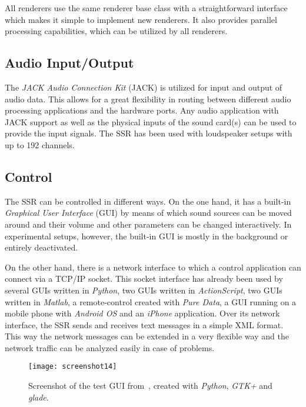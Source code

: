 \documentclass[a4paper]{article}
\begin{document}
All renderers use the same renderer base class with a straightforward interface
which makes it simple to implement new renderers.
It also provides parallel processing capabilities, which can be utilized by all
renderers.

\subsection{Audio Input/Output}

The \emph{JACK Audio Connection Kit} (JACK) is utilized for input and output of
audio data.
This allows for a great flexibility in routing between different audio
processing applications and the hardware ports.
Any audio application with JACK support as well as the physical inputs
of the sound card(s) can be used to provide the input
signals.
The SSR has been used with loudspeaker setups with up to 192 channels.

\subsection{Control}

The SSR can be controlled in different ways. On the one hand, it has a
built-in \emph{Graphical User Interface} (GUI) by means of which sound sources
can be moved around and their volume and other parameters can be changed
interactively.
In experimental setups, however, the built-in GUI is mostly in the background or
entirely deactivated.

On the other hand, there is a network interface to which a control application
can connect via a TCP/IP socket.
This socket interface has already been used by several GUIs written in
\emph{Python}, two GUIs written in \emph{ActionScript}, two GUIs written in
\emph{Matlab}, a remote-control created with \emph{Pure Data}, a GUI running on
a mobile phone with \emph{Android OS} and an \emph{iPhone} application.
Over its network interface, the SSR sends and receives text messages in a simple
XML format. This way the network messages can be extended in a very flexible way
and the network traffic can be analyzed easily in case of problems.

\begin{figure}[tb]
\begin{center}
\texttt{[image: screenshot14]}
\end{center}
\caption{Screenshot of the test GUI from~\cite{geier2010:perceptual}, created
with \emph{Python}, \emph{GTK+} and \emph{glade}.}
\label{fig:RGTscreenshot}
\end{figure}
\end{document}
